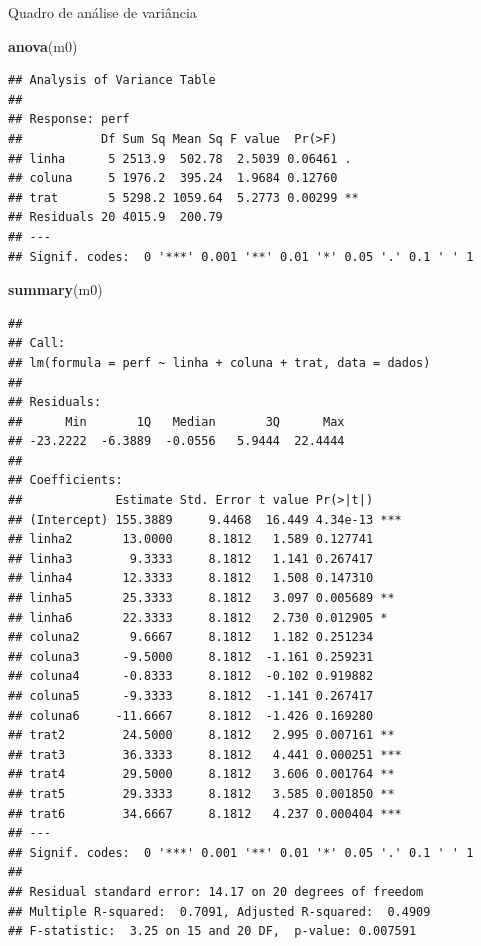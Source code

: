 \documentclass[
]{book}
\newenvironment{Shaded}{\begin{snugshade}}{\end{snugshade}}
\newcommand{\KeywordTok}[1]{\textcolor[rgb]{0.13,0.29,0.53}{\textbf{#1}}}
\newcommand{\NormalTok}[1]{#1}
\begin{document}
Quadro de análise de variância

\begin{Shaded}
\begin{Highlighting}[]
\KeywordTok{anova}\NormalTok{(m0)}
\end{Highlighting}
\end{Shaded}

\begin{verbatim}
## Analysis of Variance Table
## 
## Response: perf
##           Df Sum Sq Mean Sq F value  Pr(>F)   
## linha      5 2513.9  502.78  2.5039 0.06461 . 
## coluna     5 1976.2  395.24  1.9684 0.12760   
## trat       5 5298.2 1059.64  5.2773 0.00299 **
## Residuals 20 4015.9  200.79                   
## ---
## Signif. codes:  0 '***' 0.001 '**' 0.01 '*' 0.05 '.' 0.1 ' ' 1
\end{verbatim}

\begin{Shaded}
\begin{Highlighting}[]
\KeywordTok{summary}\NormalTok{(m0)}
\end{Highlighting}
\end{Shaded}

\begin{verbatim}
## 
## Call:
## lm(formula = perf ~ linha + coluna + trat, data = dados)
## 
## Residuals:
##      Min       1Q   Median       3Q      Max 
## -23.2222  -6.3889  -0.0556   5.9444  22.4444 
## 
## Coefficients:
##             Estimate Std. Error t value Pr(>|t|)    
## (Intercept) 155.3889     9.4468  16.449 4.34e-13 ***
## linha2       13.0000     8.1812   1.589 0.127741    
## linha3        9.3333     8.1812   1.141 0.267417    
## linha4       12.3333     8.1812   1.508 0.147310    
## linha5       25.3333     8.1812   3.097 0.005689 ** 
## linha6       22.3333     8.1812   2.730 0.012905 *  
## coluna2       9.6667     8.1812   1.182 0.251234    
## coluna3      -9.5000     8.1812  -1.161 0.259231    
## coluna4      -0.8333     8.1812  -0.102 0.919882    
## coluna5      -9.3333     8.1812  -1.141 0.267417    
## coluna6     -11.6667     8.1812  -1.426 0.169280    
## trat2        24.5000     8.1812   2.995 0.007161 ** 
## trat3        36.3333     8.1812   4.441 0.000251 ***
## trat4        29.5000     8.1812   3.606 0.001764 ** 
## trat5        29.3333     8.1812   3.585 0.001850 ** 
## trat6        34.6667     8.1812   4.237 0.000404 ***
## ---
## Signif. codes:  0 '***' 0.001 '**' 0.01 '*' 0.05 '.' 0.1 ' ' 1
## 
## Residual standard error: 14.17 on 20 degrees of freedom
## Multiple R-squared:  0.7091, Adjusted R-squared:  0.4909 
## F-statistic:  3.25 on 15 and 20 DF,  p-value: 0.007591
\end{verbatim}
\end{document}
